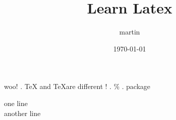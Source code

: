 \documentclass[12pt, UTF8]{article}
\date{\today}
\title{Learn Latex}
\author{martin}
\begin{document}
woo! . \TeX{}  and  \TeX are different ! . \%{} . package \newline \begin{comment} comment \end{comment}

one line \\

another line
\end{document}
